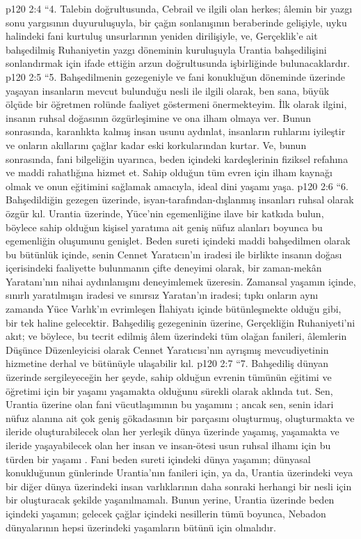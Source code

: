 \vs p120 2:4 “4. Talebin doğrultusunda, Cebrail ve ilgili olan herkes; âlemin bir yazgı sonu yargısının duyuruluşuyla, bir çağın sonlanışının beraberinde gelişiyle, uyku halindeki fani kurtuluş unsurlarının yeniden dirilişiyle, ve, Gerçeklik’e ait bahşedilmiş Ruhaniyetin yazgı döneminin kuruluşuyla Urantia bahşedilişini sonlandırmak için ifade ettiğin arzun doğrultusunda işbirliğinde bulunacaklardır.
\vs p120 2:5 “5. Bahşedilmenin gezegeniyle ve fani konukluğun döneminde üzerinde yaşayan insanların mevcut bulunduğu nesli ile ilgili olarak, ben sana, büyük ölçüde bir öğretmen rolünde faaliyet göstermeni önermekteyim. İlk olarak ilgini, insanın ruhsal doğasının özgürleşimine ve ona ilham olmaya ver. Bunun sonrasında, karanlıkta kalmış insan usunu aydınlat, insanların ruhlarını iyileştir ve onların akıllarını çağlar kadar eski korkularından kurtar. Ve, bunun sonrasında, fani bilgeliğin uyarınca, beden içindeki kardeşlerinin fiziksel refahına ve maddi rahatlığına hizmet et. Sahip olduğun tüm evren için ilham kaynağı olmak ve onun eğitimini sağlamak amacıyla, ideal dini yaşamı yaşa.
\vs p120 2:6 “6. Bahşedildiğin gezegen üzerinde, isyan\hyp{}tarafından\hyp{}dışlanmış insanları ruhsal olarak özgür kıl. Urantia üzerinde, Yüce’nin egemenliğine ilave bir katkıda bulun, böylece sahip olduğun kişisel yaratıma ait geniş nüfuz alanları boyunca bu egemenliğin oluşumunu genişlet. Beden sureti içindeki maddi bahşedilmen olarak bu bütünlük içinde, senin Cennet Yaratıcın’ın iradesi ile birlikte insanın doğası içerisindeki faaliyette bulunmanın çifte deneyimi olarak, bir zaman\hyp{}mekân Yaratanı’nın nihai aydınlanışını deneyimlemek üzeresin. Zamansal yaşamın içinde, sınırlı yaratılmışın iradesi ve sınırsız Yaratan’ın iradesi; tıpkı onların aynı zamanda Yüce Varlık’ın evrimleşen İlahiyatı içinde bütünleşmekte olduğu gibi, bir tek haline gelecektir. Bahşediliş gezegeninin üzerine, Gerçekliğin Ruhaniyeti’ni akıt; ve böylece, bu tecrit edilmiş âlem üzerindeki tüm olağan fanileri, âlemlerin Düşünce Düzenleyicisi olarak Cennet Yaratıcısı’nın ayrışmış mevcudiyetinin hizmetine derhal ve bütünüyle ulaşabilir kıl.
\vs p120 2:7 “7. Bahşediliş dünyan üzerinde sergileyeceğin her şeyde, sahip olduğun evrenin tümünün eğitimi ve öğretimi için bir yaşamı yaşamakta olduğunu sürekli olarak aklında tut. Sen, Urantia üzerine olan fani vücutlaşımının bu yaşamını ; ancak sen, senin idari nüfuz alanına ait çok geniş gökadasının bir parçasını oluşturmuş, oluşturmakta ve ileride oluşturabilecek olan her yerleşik dünya üzerinde yaşamış, yaşamakta ve ileride yaşayabilecek olan her insan ve insan\hyp{}ötesi usun ruhsal ilhamı için bu türden bir yaşamı . Fani beden sureti içindeki dünya yaşamın; dünyasal konukluğunun günlerinde Urantia’nın fanileri için, ya da, Urantia üzerindeki veya bir diğer dünya üzerindeki insan varlıklarının daha sonraki herhangi bir nesli için bir  oluşturacak şekilde yaşanılmamalı. Bunun yerine, Urantia üzerinde beden içindeki yaşamın; gelecek çağlar içindeki nesillerin tümü boyunca, Nebadon dünyalarının hepsi üzerindeki yaşamların bütünü için olmalıdır.
